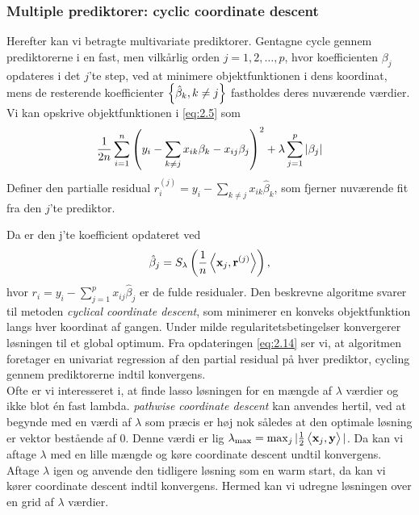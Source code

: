 \subsubsection{Multiple prediktorer: cyclic coordinate descent}
Herefter kan vi betragte multivariate prediktorer. 
Gentagne cycle gennem prediktorerne i en fast, men vilkårlig orden $j=1, 2, \ldots, p$, hvor koefficienten $\beta_j$ opdateres i det $j$'te step, ved at minimere objektfunktionen i dens koordinat, mens de resterende koefficienter $\cbr{\hat{\beta}_k, k \neq j}$ fastholdes deres nuværende værdier. 
Vi kan opskrive objektfunktionen i \eqref{eq:2.5} som
\begin{align*}
\frac{1}{2n} \sum_{i=1}^n \del{y_i - \sum_{k \neq j} x_{ik} \beta_k - x_{ij} \beta_j}^2 + \lambda \sum_{j = 1}^p \vert \beta_j \vert
\end{align*}
Definer den partialle residual $r_i^{(j)}=y_i - \sum_{k \neq j} x_{ik} \hat{\beta}_k$, som fjerner nuværende fit fra den $j$'te prediktor.


Da er den j'te koefficient opdateret ved
\begin{align}
\hat{\beta}_j = S_\lambda \del{\frac{1}{n} \left\langle \mathbf{x}_j, \mathbf{r}^{(j)} \right\rangle}, \label{eq:2.14}
\end{align}
hvor \(r_i = y_i - \sum_{j = 1}^p x_{ij} \hat{\beta}_j \) er de fulde residualer.
Den beskrevne algoritme svarer til metoden \textit{cyclical coordinate descent}, som minimerer en konveks objektfunktion langs hver koordinat af gangen.
Under milde regularitetsbetingelser konvergerer løsningen til et global optimum.
Fra opdateringen \eqref{eq:2.14} ser vi, at algoritmen foretager en univariat regression af den partial residual på hver prediktor, cycling gennem prediktorerne indtil konvergens. \\

Ofte er vi interesseret i, at finde lasso løsningen for en mængde af \(\lambda\) værdier og ikke blot én fast lambda.
\textit{pathwise coordinate descent} kan anvendes hertil, ved at begynde med en værdi af \(\lambda\) som præcis er høj nok således at den optimale løsning er vektor bestående af \(0\).
Denne værdi er lig \(\lambda_{\max}=\max_j \vert \frac{1}{2} \left\langle \mathbf{x}_j, \mathbf{y} \right\rangle \vert\).
Da kan vi aftage \(\lambda\) med en lille mængde og køre coordinate descent undtil konvergens.
Aftage \(\lambda\) igen og anvende den tidligere løsning som en warm start, da kan vi kører coordinate descent indtil konvergens.
Hermed kan vi udregne løsningen over en grid af \(\lambda\) værdier. \\

